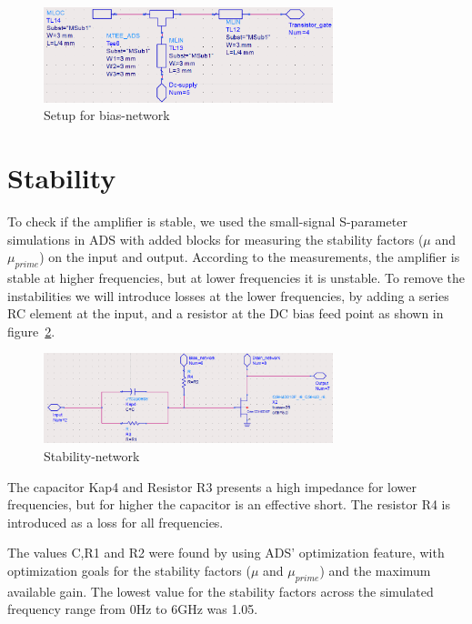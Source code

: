   \begin{figure}[h]
	\centering
	\includegraphics[width=0.75\textwidth]{img/Bias_network}
	\caption{Setup for bias-network}
	\label{fig:fig_bias_net}
  \end{figure}
  
  \section{Stability}
  To check if the amplifier is stable, we used the small-signal S-parameter simulations in ADS with added blocks for measuring the stability factors ($\mu$ and $\mu_{prime}$) on the input and output. According to the measurements, the amplifier is stable at higher frequencies, but at lower frequencies it is unstable. To remove the instabilities we will introduce losses at the lower frequencies, by adding a series RC element at the input, and a resistor at the DC bias feed point as shown in figure~\ref{fig:fig_stab_net}.
  \begin{figure}[h]
	\centering
	\includegraphics[width=0.75\textwidth]{img/Stability_network}
	\caption{Stability-network}
	\label{fig:fig_stab_net}
  \end{figure}
  The capacitor Kap4 and Resistor R3 presents a high impedance for lower frequencies, but for higher the capacitor is an effective short. The resistor R4 is introduced as a loss for all frequencies.
  
  The values C,R1 and R2 were found by using ADS’ optimization feature, with optimization goals for the stability factors ($\mu$ and $\mu_{prime}$) and the maximum available gain. The lowest value for the stability factors across the simulated frequency range from 0Hz to 6GHz was 1.05.

